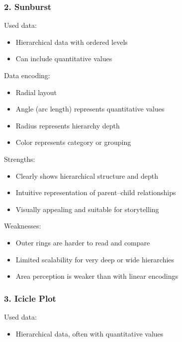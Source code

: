\begin{exercise}
        \subsubsection*{2. Sunburst}

        Used data:
        \begin{itemize}
            \item Hierarchical data with ordered levels
            \item Can include quantitative values
        \end{itemize}

        Data encoding:
        \begin{itemize}
            \item Radial layout
            \item Angle (arc length) represents quantitative values
            \item Radius represents hierarchy depth
            \item Color represents category or grouping
        \end{itemize}

        Strengths:
        \begin{itemize}
            \item Clearly shows hierarchical structure and depth
            \item Intuitive representation of parent--child relationships
            \item Visually appealing and suitable for storytelling
        \end{itemize}

        Weaknesses:
        \begin{itemize}
            \item Outer rings are harder to read and compare
            \item Limited scalability for very deep or wide hierarchies
            \item Area perception is weaker than with linear encodings
        \end{itemize}

        \subsubsection*{3. Icicle Plot}

        Used data:
        \begin{itemize}
            \item Hierarchical data, often with quantitative values
        \end{itemize}


\end{exercise}
